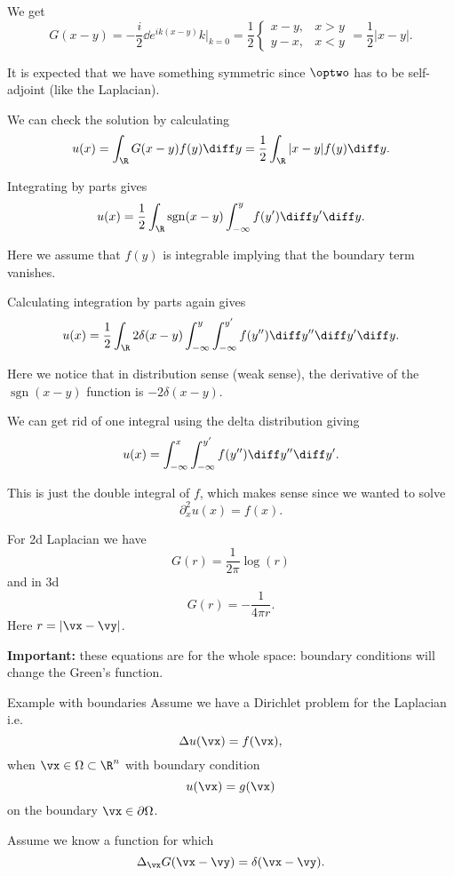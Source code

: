 \begin{frame}
	We get 
	\[ G(x-y) = -\frac{i}{2} \dd{e^{ik(x-y)}}{k}\Bigg|_{k=0} = \frac{1}{2}\begin{cases}
		x-y, & x>y\\
		y-x, & x<y
	\end{cases} = \frac{1}{2} |x-y|. \]
	
	\pause
	It is expected that we have something symmetric since $ \optwo $ has to be self-adjoint (like the Laplacian). 
	
	\pause
	We can check the solution by calculating
	\[ u(x) = \int_{\R} G(x-y) f(y) \diff y = \frac{1}{2} \int_{\R} |x-y| f(y) \diff y. \]
	
	\pause
	Integrating by parts gives 
	\[ u(x) = \frac{1}{2} \int_{\R} \operatorname{sgn}(x-y) \int_{-\infty}^{y}f(y') \diff y' \diff y. \]
	
	\pause
	Here we assume that $ f(y) $ is integrable implying that the boundary term vanishes. 
\end{frame}

\begin{frame}
	Calculating integration by parts again gives
	\[ u(x) = \frac{1}{2} \int_{\R} 2 \delta(x-y) \int_{-\infty}^{y} \int_{-\infty}^{y'} f(y'') \diff y'' \diff y' \diff y. \]
	
	\pause
	Here we notice that in distribution sense (weak sense), the derivative of the $ \operatorname{sgn}(x-y) $ function is $ -2 \delta(x-y) $. 
	
	\pause
	We can get rid of one integral using the delta distribution giving
	\[ u(x) =  \int_{-\infty}^{x} \int_{-\infty}^{y'} f(y'') \diff y'' \diff y'. \]
	
	\pause
	This is just the double integral of $ f $, which makes sense since we wanted to solve
	\[ \partial_x^2 u(x) = f(x). \]
\end{frame}

\begin{frame}
	For 2d Laplacian we have 
	\[ G(r) = \frac{1}{2\pi} \log(r) \]
	and in 3d
	\[ G(r) = -\frac{1}{4\pi r}. \]
	Here $ r = |\vx - \vy| $.
	
	\pause
	\textbf{Important:} these equations are for the whole space: boundary conditions will change the Green's function. 
\end{frame}

\begin{frame}{Example with boundaries}
	Assume we have a Dirichlet problem for the Laplacian i.e.
	\[ \Delta u(\vx) = f(\vx), \]
	when $ \vx \in \Omega \subset \R^n $ with boundary condition
	\[ u(\vx) = g(\vx) \]
	on the boundary $ \vx \in \partial \Omega $.
	
	\pause
	Assume we know a function for which 
	\[ \Delta_\vx G(\vx-\vy) = \delta(\vx-\vy). \]
\end{frame}

